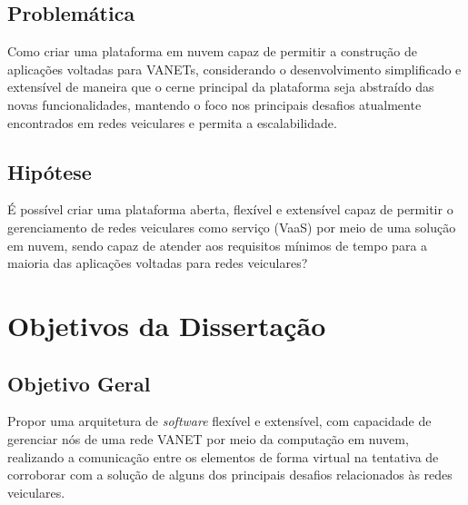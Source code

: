\documentclass[
	12pt,				%
	oneside,			%
	a4paper,			%
	english,			%
	brazil				%
	]{abntex2ppgsi}
\begin{document}
\subsection{Problemática}

Como criar uma plataforma em nuvem capaz de permitir a construção de aplicações voltadas para VANETs, considerando o desenvolvimento simplificado e extensível de maneira que o cerne principal da plataforma seja abstraído das novas funcionalidades, mantendo o foco nos principais desafios atualmente encontrados em redes veiculares e permita a escalabilidade. 

\subsection{Hipótese}

É possível criar uma plataforma aberta, flexível e extensível capaz de permitir o gerenciamento de redes veiculares como serviço (VaaS) por meio de uma solução em nuvem, sendo capaz de atender aos requisitos mínimos de tempo para a maioria das aplicações voltadas para redes veiculares?


\section{Objetivos da Dissertação}

\subsection{Objetivo Geral}
Propor uma arquitetura de \textit{software} flexível e extensível, com capacidade de gerenciar nós de uma rede VANET por meio da computação em nuvem, realizando a comunicação entre os elementos de forma virtual na tentativa de corroborar com a solução de alguns dos principais desafios relacionados às redes veiculares.

\end{document}
